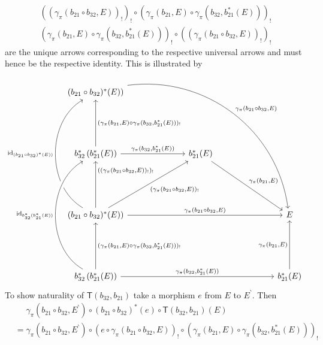\begin{enumerate}
\begin{align*}
  ((\gamma_{\pi}(b_{21} \circ b_{32},E))_{!})_{!}
  \circ
  \left(
    \gamma_{\pi}(b_{21},E)
    \circ
    \gamma_{\pi}(b_{32},b_{21}^{\ast}(E))
  \right)_{!}
  \\
  \left(
    \gamma_{\pi}(b_{21},E)
    \circ
    \gamma_{\pi}(b_{32},b_{21}^{\ast}(E))
  \right)_{!}
  \circ
  ((\gamma_{\pi}(b_{21} \circ b_{32},E))_{!})_{!}
\end{align*}
are the unique arrows corresponding to the respective universal arrows and must hence be the respective identity. This is illustrated by
\[
\begin{tikzcd}[row sep=13ex,column sep=16ex]
  (b_{21} \circ b_{32})^{\ast}(E))
  \arrow[bend left=45]{ddrr}{\gamma_{\pi}(b_{21} \circ b_{32},E)}
  &
  &
  \\
  b_{32}^{\ast}
  \left(
    b_{21}^{\ast}(E)
  \right)
  \arrow[swap]{u}{(\gamma_{\pi}(b_{21},E) \circ \gamma_{\pi}(b_{32},b_{21}^{\ast}(E)))_{!}}
  \arrow{r}{\gamma_{\pi}(b_{32},b_{21}^{\ast}(E))}
  &
  b_{21}^{\ast}(E)
  \arrow{dr}{\gamma_{\pi}(b_{21},E)}
  &
  \\
  (b_{21} \circ b_{32})^{\ast}(E))
  \arrow[swap]{u}[pos=0.8]{((\gamma_{\pi}(b_{21} \circ b_{32},E))_{!})_{!}}
  \arrow[bend left=60,crossing over]{uu}{\mathrm{id}_{(b_{21} \circ b_{32})^{\ast}(E))}}
  \arrow[swap]{ur}{(\gamma_{\pi}(b_{21} \circ b_{32},E))_{!}}
  \arrow{rr}{\gamma_{\pi}(b_{21} \circ b_{32},E)}
  &
  &
  E
  \\
  b_{32}^{\ast}
  \left(
    b_{21}^{\ast}(E)
  \right)
  \arrow[swap]{u}{(\gamma_{\pi}(b_{21},E) \circ \gamma_{\pi}(b_{32},b_{21}^{\ast}(E)))_{!}}
  \arrow[bend left=60,crossing over]{uu}{\mathrm{id}_{b_{32}^{\ast}(b_{21}^{\ast}(E))}}
  \arrow{rr}{\gamma_{\pi}(b_{32},b_{21}^{\ast}(E))}
  &
  &
  b_{21}^{\ast}(E)
  \arrow{u}{\gamma_{\pi}(b_{21},E)}
\end{tikzcd}
\]
To show naturality of $\mathsf{T}(b_{32},b_{21})$ take a morphism $e$ from $E$ to $E^{\backprime}$. Then
\begin{align*}
  &\phantom{=}
  \gamma_{\pi}(b_{21} \circ b_{32},E^{\backprime})
  \circ
  \left(
    b_{21}
    \circ
    b_{32}
  \right)^{\ast}
  (e)
  \circ
  \mathsf{T}(b_{32},b_{21})(E)
  \\
  &=
  \gamma_{\pi}(b_{21} \circ b_{32},E^{\backprime})
  \circ
  \left(
    e
    \circ
    \gamma_{\pi}(b_{21} \circ b_{32},E)
  \right)_{!}
  \circ
  \left(
    \gamma_{\pi}(b_{21},E)
    \circ
    \gamma_{\pi}(b_{32},b_{21}^{\ast}(E))
  \right)_{!}
  \\

\end{align*}
\end{enumerate}

